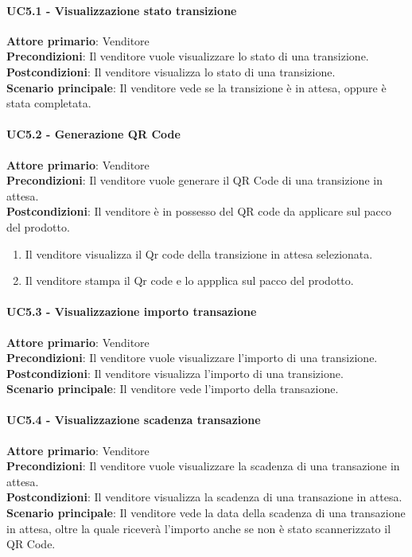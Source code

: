 \documentclass[a4paper, 12pt]{article}
\begin{document}
\paragraph{UC5.1 - Visualizzazione stato transizione}
\textbf{Attore primario}: Venditore\\
\textbf{Precondizioni}: Il venditore vuole visualizzare lo stato di una transizione.\\
\textbf{Postcondizioni}: Il venditore visualizza lo stato di una transizione.\\
\textbf{Scenario principale}: Il venditore vede se la transizione è in attesa, oppure è stata completata.\\

\paragraph{UC5.2 - Generazione QR Code}
\textbf{Attore primario}: Venditore\\
\textbf{Precondizioni}: Il venditore vuole generare il QR Code di una transizione in attesa.\\
\textbf{Postcondizioni}: Il venditore è in possesso del QR code da applicare sul pacco del prodotto.\\
\begin{enumerate}
\item Il venditore visualizza il Qr code della transizione in attesa selezionata.
\item Il venditore stampa il Qr code e lo appplica sul pacco del prodotto.
\end{enumerate}

\paragraph{UC5.3 - Visualizzazione importo transazione}
\textbf{Attore primario}: Venditore\\
\textbf{Precondizioni}: Il venditore vuole visualizzare l'importo di una transizione.\\
\textbf{Postcondizioni}: Il venditore visualizza l'importo di una transizione.\\
\textbf{Scenario principale}: Il venditore vede l'importo della transazione.\\

\paragraph{UC5.4 - Visualizzazione scadenza transazione}
\textbf{Attore primario}: Venditore\\
\textbf{Precondizioni}: Il venditore vuole visualizzare la scadenza di una transazione in attesa.\\
\textbf{Postcondizioni}: Il venditore visualizza la scadenza di una transazione in attesa.\\
\textbf{Scenario principale}: Il venditore vede la data della scadenza di una transazione in attesa, oltre la quale riceverà l'importo anche se non è stato scannerizzato il QR Code.\\
\end{document}
